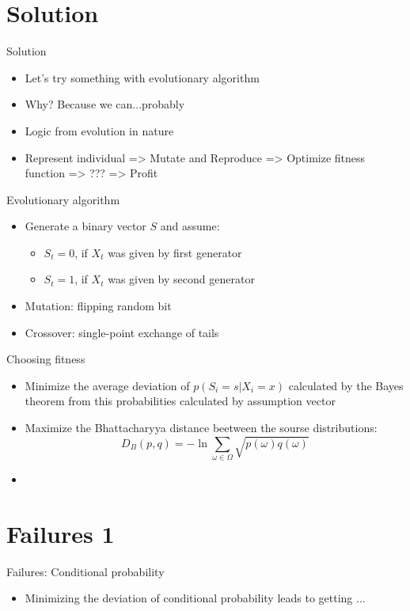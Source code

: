 \documentclass[hyperref=unicode,graphics=pdflatex,13pt]{beamer}
\begin{document}
\section{Solution} %
\begin{frame}{Solution}
  \begin{itemize}
   \item Let's try something with evolutionary algorithm
   \item Why? Because we can...probably
   \item Logic from evolution in nature
   \item Represent individual => Mutate and Reproduce => Optimize fitness function => ??? => Profit
  \end{itemize}

\end{frame}

\begin{frame}{Evolutionary algorithm}
 \begin{itemize}
  \item Generate a binary vector $S$ and assume:
   \begin{itemize}
   \item $S_t = 0$, if $X_t$ was given by first generator
   \item $S_t = 1$, if $X_t$ was given by second generator
   \end{itemize}
  \item Mutation: flipping random bit
  \item Crossover: single-point exchange of tails
 \end{itemize}
\end{frame}

\begin{frame}{Choosing fitness}
\begin{itemize}
   \item Minimize the average deviation of $p(S_i=s | X_i = x)$ calculated by the Bayes theorem from this probabilities calculated by assumption vector
   \item Maximize the Bhattacharyya distance beetween the sourse distributions:
   $$D_B(p, q) = -\ln{\sum_{\omega \in \Omega} \sqrt{p(\omega)q(\omega)}}$$
   \item %
\end{itemize}

\end{frame}

\section{Failures 1}
\begin{frame}{Failures: Conditional probability}
 \begin{itemize}
  \item Minimizing the deviation of conditional probability leads to getting ...
 \end{itemize}

\end{frame}
\end{document}
